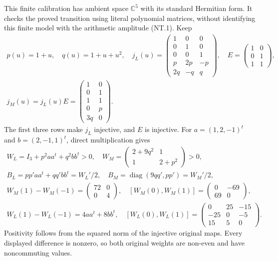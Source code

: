 \documentclass[11pt]{article}
\newcommand{\diag}{\operatorname{diag}}
\begin{document}
This finite calibration has ambient space $\mathbb C^5$ with its
standard Hermitian form. It checks the proved transition using
literal polynomial matrices, without identifying this finite model
with the arithmetic amplitude (NT.1). Keep
\[
 \begin{gathered}
 p(u)=1+u,\quad q(u)=1+u+u^2,\quad
 j_L(u)=\begin{pmatrix}
 1&0&0\\0&1&0\\0&0&1\\p&2p&-p\\2q&-q&q
 \end{pmatrix},\quad
 E=\begin{pmatrix}1&0\\0&1\\1&1\end{pmatrix},\\
 j_M(u)=j_L(u)E=\begin{pmatrix}1&0\\0&1\\1&1\\0&p\\3q&0\end{pmatrix}.
 \end{gathered}
 \tag{NT.31}
\]
The first three rows make $j_L$ injective, and $E$ is injective.
For $a=(1,2,-1)^t$ and $b=(2,-1,1)^t$, direct multiplication gives
\[
 \begin{gathered}
 W_L=I_3+p^2aa^t+q^2bb^t>0,\quad
 W_M=\begin{pmatrix}2+9q^2&1\\1&2+p^2\end{pmatrix}>0,\\
 B_L=pp'aa^t+qq'bb^t=W_L'/2,\quad
 B_M=\diag(9qq',pp')=W_M'/2,\\
 W_M(1)-W_M(-1)=\begin{pmatrix}72&0\\0&4\end{pmatrix},\quad
 [W_M(0),W_M(1)]=\begin{pmatrix}0&-69\\69&0\end{pmatrix},\\
 W_L(1)-W_L(-1)=4aa^t+8bb^t,\quad
 [W_L(0),W_L(1)]=\begin{pmatrix}0&25&-15\\-25&0&-5\\15&5&0\end{pmatrix}.
 \end{gathered}
 \tag{NT.32}
\]
Positivity follows from the squared norm of the injective original
maps. Every displayed difference is nonzero, so both original
weights are non-even and have noncommuting values.
\end{document}
